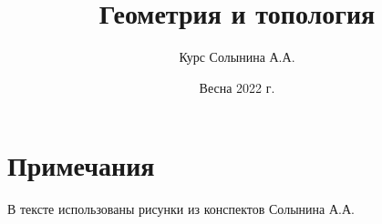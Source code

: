\documentclass[12pt, a4paper, oneside]{memoir}
\title{Геометрия и топология}
\author{Курс Солынина А.А.}
\date{Весна 2022 г.}
\begin{document}
\frontmatter

\begin{titlingpage}
    \maketitle
\end{titlingpage}

\section*{Примечания}
В тексте использованы рисунки из конспектов Солынина А.А.
\newpage

\tableofcontents
{}


\mainmatter







\end{document}
